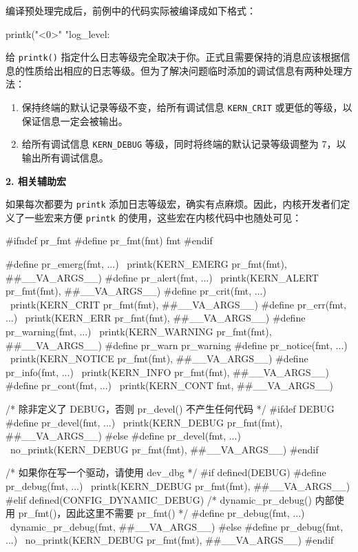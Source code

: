 编译预处理完成后，前例中的代码实际被编译成如下格式：

\begin{CodeBlock}[language=BookC]
printk("<0>" "log_level:%
\end{CodeBlock}

给 \texttt{printk()} 指定什么日志等级完全取决于你。正式且需要保持的消息应该根据信息的性质给出相应的日志等级。但为了解决问题临时添加的调试信息有两种处理方法：

\begin{enumerate}
\def\labelenumi{\arabic{enumi}.}
\tightlist
\item
  保持终端的默认记录等级不变，给所有调试信息 \texttt{KERN\_CRIT} 或更低的等级，以保证信息一定会被输出。
\item
  给所有调试信息 \texttt{KERN\_DEBUG} 等级，同时将终端的默认记录等级调整为 7，以输出所有调试信息。
\end{enumerate}

\textbf{2. 相关辅助宏}

如果每次都要为 \texttt{printk} 添加日志等级宏，确实有点麻烦。因此，内核开发者们定义了一些宏来方便 \texttt{printk} 的使用，这些宏在内核代码中也随处可见：

\begin{CodeBlock}[language=BookC]
#ifndef pr_fmt
#define pr_fmt(fmt) fmt
#endif

#define pr_emerg(fmt, ...) \
    printk(KERN_EMERG pr_fmt(fmt), ##__VA_ARGS__)
#define pr_alert(fmt, ...) \
    printk(KERN_ALERT pr_fmt(fmt), ##__VA_ARGS__)
#define pr_crit(fmt, ...) \
    printk(KERN_CRIT pr_fmt(fmt), ##__VA_ARGS__)
#define pr_err(fmt, ...) \
    printk(KERN_ERR pr_fmt(fmt), ##__VA_ARGS__)
#define pr_warning(fmt, ...) \
    printk(KERN_WARNING pr_fmt(fmt), ##__VA_ARGS__)
#define pr_warn pr_warning
#define pr_notice(fmt, ...) \
    printk(KERN_NOTICE pr_fmt(fmt), ##__VA_ARGS__)
#define pr_info(fmt, ...) \
    printk(KERN_INFO pr_fmt(fmt), ##__VA_ARGS__)
#define pr_cont(fmt, ...) \
    printk(KERN_CONT fmt, ##__VA_ARGS__)

/* 除非定义了 DEBUG，否则 pr_devel() 不产生任何代码 */
#ifdef DEBUG
#define pr_devel(fmt, ...) \
    printk(KERN_DEBUG pr_fmt(fmt), ##__VA_ARGS__)
#else
#define pr_devel(fmt, ...) \
    no_printk(KERN_DEBUG pr_fmt(fmt), ##__VA_ARGS__)
#endif

/* 如果你在写一个驱动，请使用 dev_dbg */
#if defined(DEBUG)
#define pr_debug(fmt, ...) \
    printk(KERN_DEBUG pr_fmt(fmt), ##__VA_ARGS__)
#elif defined(CONFIG_DYNAMIC_DEBUG)
/* dynamic_pr_debug() 内部使用 pr_fmt()，因此这里不需要 pr_fmt() */
#define pr_debug(fmt, ...) \
    dynamic_pr_debug(fmt, ##__VA_ARGS__)
#else
#define pr_debug(fmt, ...) \
    no_printk(KERN_DEBUG pr_fmt(fmt), ##__VA_ARGS__)
#endif
\end{CodeBlock}

